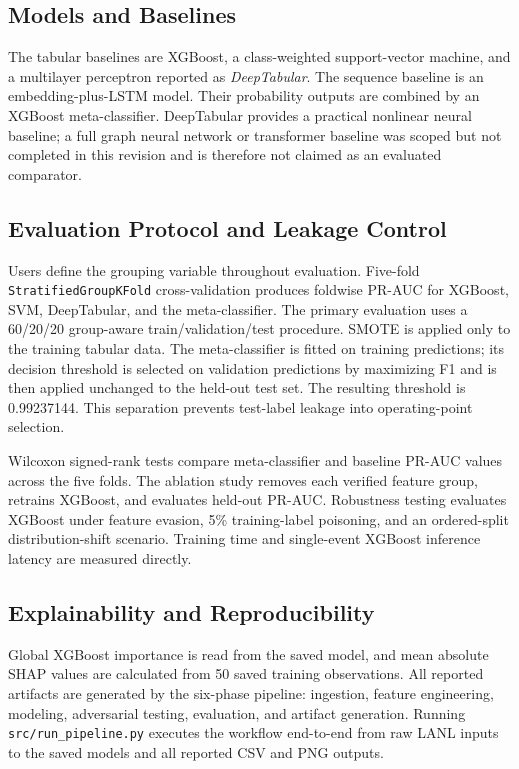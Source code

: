 \subsection{Models and Baselines}
The tabular baselines are XGBoost, a class-weighted support-vector machine, and a multilayer perceptron reported as \emph{DeepTabular}. The sequence baseline is an embedding-plus-LSTM model. Their probability outputs are combined by an XGBoost meta-classifier. DeepTabular provides a practical nonlinear neural baseline; a full graph neural network or transformer baseline was scoped but not completed in this revision and is therefore not claimed as an evaluated comparator.

\subsection{Evaluation Protocol and Leakage Control}
Users define the grouping variable throughout evaluation. Five-fold \texttt{StratifiedGroupKFold} cross-validation produces foldwise PR-AUC for XGBoost, SVM, DeepTabular, and the meta-classifier. The primary evaluation uses a 60/20/20 group-aware train/validation/test procedure. SMOTE is applied only to the training tabular data. The meta-classifier is fitted on training predictions; its decision threshold is selected on validation predictions by maximizing F1 and is then applied unchanged to the held-out test set. The resulting threshold is 0.99237144. This separation prevents test-label leakage into operating-point selection.

Wilcoxon signed-rank tests compare meta-classifier and baseline PR-AUC values across the five folds. The ablation study removes each verified feature group, retrains XGBoost, and evaluates held-out PR-AUC. Robustness testing evaluates XGBoost under feature evasion, 5\% training-label poisoning, and an ordered-split distribution-shift scenario. Training time and single-event XGBoost inference latency are measured directly.

\subsection{Explainability and Reproducibility}
Global XGBoost importance is read from the saved model, and mean absolute SHAP values are calculated from 50 saved training observations. All reported artifacts are generated by the six-phase pipeline: ingestion, feature engineering, modeling, adversarial testing, evaluation, and artifact generation. Running \texttt{src/run\_pipeline.py} executes the workflow end-to-end from raw LANL inputs to the saved models and all reported CSV and PNG outputs.
